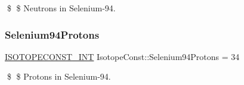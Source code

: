 \$ \$ Neutrons in Selenium-\/94. \mbox{\label{group___isotope_const-_selenium-_se94_gad2a2f79379fed8d89f26c483c595b3a8}} 
\subsubsection{\texorpdfstring{Selenium94\+Protons}{Selenium94Protons}}
{\footnotesize\ttfamily \mbox{\hyperlink{group___isotope_const-_macros_ga5f18360b3e99483a35c32d789e62621c}{I\+S\+O\+T\+O\+P\+E\+C\+O\+N\+S\+T\+\_\+\+I\+NT}} Isotope\+Const\+::\+Selenium94\+Protons = 34}

\$ \$ Protons in Selenium-\/94. 